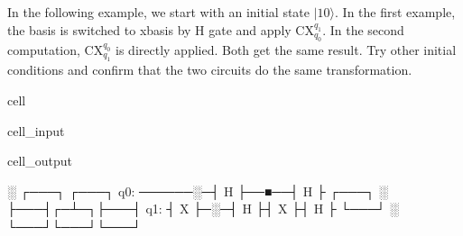 \documentclass[letterpaper,10pt,english]{jupyterBook}
\begin{document}
\sphinxAtStartPar
In the following example, we start with an initial state \(|10\rangle\). In the first example, the basis is switched to x\sphinxhyphen{}basis by H gate and apply CX\(_{q_0}^{q_1}\). In the second computation, CX\(_{q_1}^{q_0}\) is directly applied. Both get the same result. Try other initial conditions and confirm that the two circuits do the same transformation.

\begin{sphinxuseclass}{cell}\begin{sphinxVerbatimInput}

\begin{sphinxuseclass}{cell_input}
\begin{sphinxVerbatim}[commandchars=\\\{\}]
   

  
  

\PYG{p}{[}\PYG{p}{]}
\PYG{p}{[}\PYG{p}{]}
\end{sphinxVerbatim}

\end{sphinxuseclass}\end{sphinxVerbatimInput}
\begin{sphinxVerbatimOutput}

\begin{sphinxuseclass}{cell_output}
\begin{sphinxVerbatim}[commandchars=\\\{\}]
           ░ ┌───┐     ┌───┐
q\PYGZus{}0: ──────░─┤ H ├──■──┤ H ├
     ┌───┐ ░ ├───┤┌─┴─┐├───┤
q\PYGZus{}1: ┤ X ├─░─┤ H ├┤ X ├┤ H ├
     └───┘ ░ └───┘└───┘└───┘
\end{sphinxVerbatim}

\end{sphinxuseclass}\end{sphinxVerbatimOutput}

\end{sphinxuseclass}
\end{document}
